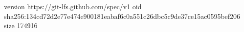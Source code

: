 version https://git-lfs.github.com/spec/v1
oid sha256:134cd72d2e77e474e900181eabaf6c0a551c26dbc5c9de37ce15ac0595bef206
size 174916

